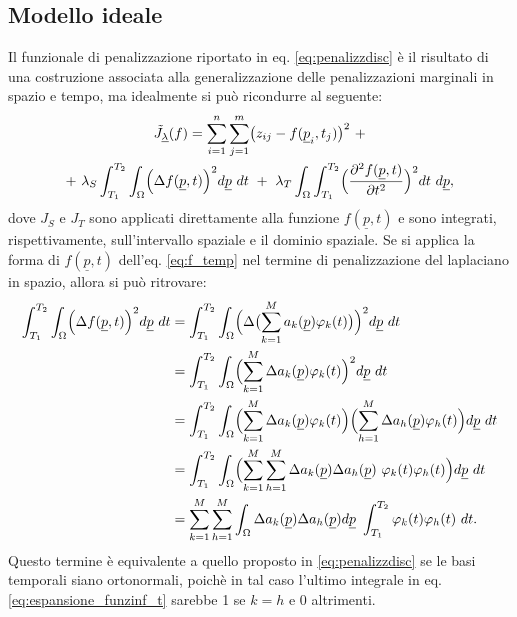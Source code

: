 \documentclass[a4paper,11pt,twoside,openright]{book}							%
\begin{document}
\subsection{Modello ideale}
Il funzionale di penalizzazione riportato in eq. \ref{eq:penalizzdisc} è il risultato di una costruzione associata alla generalizzazione delle penalizzazioni marginali in spazio e tempo, ma idealmente si può ricondurre al seguente:
\begin{multline}
\label{eq:Jfunc_cont}
\tilde J_{\underline \lambda }(f) = \sum_{i=1}^n \sum_{j=1}^m \bigl( z_{ij} - f(\underline p_i,t_j) \bigr)^2 \ + \\+\   \lambda_S \int_{T_1}^{T_2} \int_\Omega \Bigl( \Delta f(\underline p, t)  \Bigr)^2 d\underline p\ dt \ +\  \lambda_T \int_\Omega \int_{T_1}^{T_2} \Bigl( \frac{\partial^2 f(\underline p, t) }{\partial t ^2} \Bigr)^2 dt\ d\underline p ,
\end{multline}
dove $J_S$ e $J_T$ sono applicati direttamente alla funzione $f(\underline p, t)$ e sono integrati, rispettivamente, sull'intervallo spaziale e il dominio spaziale.
\newpage
Se si applica la forma di $f(\underline p,t)$ dell'eq. \ref{eq:f_temp} nel termine di penalizzazione del laplaciano in spazio, allora si può ritrovare:
\begin{equation} 
\label{eq:espansione_funzinf_t}
\begin{split}
\int_{T_1}^{T_2} \int_\Omega \Bigl( \Delta f(\underline p, t)  \Bigr)^2 d\underline p\ dt 
&=\int_{T_1}^{T_2} \int_\Omega \Bigl( \Delta \bigl( \sum_{k=1}^M a_k(\underline p) \varphi_k(t) \bigr)  \Bigr)^2 d\underline p\ dt \\
&=\int_{T_1}^{T_2} \int_\Omega \Bigl( \sum_{k=1}^M \Delta a_k(\underline p) \varphi_k(t)  \Bigr)^2 d\underline p\ dt \\
&=\int_{T_1}^{T_2} \int_\Omega \Bigl( \sum_{k=1}^M \Delta a_k(\underline p) \varphi_k(t)  \Bigr)\Bigl( \sum_{h=1}^M \Delta a_h(\underline p) \varphi_h(t)  \Bigr) d\underline p\ dt \\
&=\int_{T_1}^{T_2} \int_\Omega \Bigl( \sum_{k=1}^M \sum_{h=1}^M \Delta a_k(\underline p)\Delta a_h(\underline p)\ \varphi_k(t)  \varphi_h(t)  \Bigr) d\underline p\ dt \\
&=\sum_{k=1}^M \sum_{h=1}^M \int_\Omega   \Delta a_k(\underline p) \Delta a_h(\underline p)d\underline p \ \int_{T_1}^{T_2} \varphi_k(t)\varphi_h(t)   \ dt .
\end{split}
\end{equation}
Questo termine è equivalente a quello proposto in \ref{eq:penalizzdisc} se le basi temporali siano ortonormali, poichè in tal caso l'ultimo integrale in eq. \ref{eq:espansione_funzinf_t} sarebbe 1 se $k=h$ e 0 altrimenti.
\end{document}
